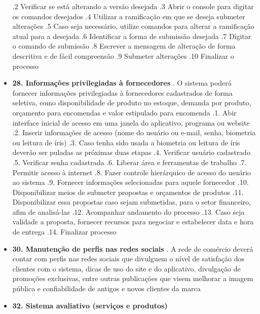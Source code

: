 \begin{itemize}[label={}]
			.2 Verificar se está alterando a versão desejada
			.3 Abrir o console para digitar os comandos desejados
			.4 Utilizar a ramificação em que se deseja submeter alterações
			.5 Caso seja necessário, utilize comandos para alterar a ramificação atual para a desejada
			.6 Identificar a forma de submissão desejada
			.7 Digitar o comando de submissão
			.8 Escrever a mensagem de alteração de forma descritiva e de fácil compreensão
			.9 Submeter alterações
			.10 Finalizar o processo
	\item \textbf{28. Informações privilegiadas à fornecedores}
		. O sistema poderá fornecer informações privilegiadas à fornecedores cadastrados de forma seletiva, como disponibilidade de produto no estoque, demanda por produto, orçamento para encomendas e valor estipulado para encomenda
			.1. Abir interface inicial de acesso em uma janela do aplicativo, programa ou website
			.2. Inserir informações de acesso (nome do usuário ou e-mail, senha, biometria ou leitura de íris)
			.3. Caso tenha sido usada a biometria ou leitura de íris deverão ser puladas as próximas duas etapas
			.4. Verificar usuário cadastrado 
			.5. Verificar senha cadastrada
			.6. Liberar área e ferramentas de trabalho
			.7. Permitir acesso à internet
			.8. Fazer controle hierárquico de acesso do usuário ao sistema
			.9. Fornecer informações selecionadas para aquele fornecedor
			.10. Disponibilizar meios de submeter propostas e orçamentos de produtos
			.11. Disponibilizar essa propostas caso sejam submetidas, para o setor financeiro, afim de analisá-las
			.12. Acompanhar andamento do processo
			.13. Caso seja validade a proposta, fornecer recursos para negociar e estabelecer data e hora de entrega
			.14. Finalizar processo
	\item \textbf{30. Manutenção de perfis nas redes sociais}
		. A rede de comércio deverá contar com perfis nas redes sociais que divulguem o nível de satisfação dos clientes com o sistema, dicas de uso do site e do aplicativo, divulgação de promoções exclusivas, entre outras publicações que visem melhorar a imagem pública e confiabilidade de antigos e novos clientes da marca 
	\item \textbf{32. Sistema avaliativo (serviços e produtos)}

\end{itemize}
